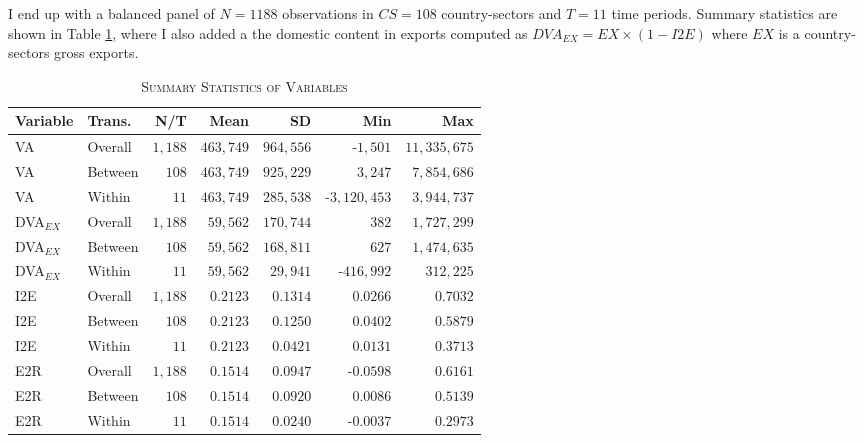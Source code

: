 \documentclass[a4paper]{article}
\begin{document}
I end up with a balanced panel of $N = 1188$ observations in $CS = 108$ country-sectors and $T = 11$ time periods. Summary statistics are shown in Table \ref{tab:SUMM_GROWTH}, where I also added a the domestic content in exports computed as $DVA_{EX} = EX \times (1 - I2E)$ where $EX$ is a country-sectors gross exports. 

\begin{table}[h!] \centering 
  \caption{\label{tab:SUMM_GROWTH}\textsc{Summary Statistics of Variables}}
  \vspace{2mm}
  \begin{center}
\begin{tabular}{ llrrrrr} \toprule
Variable & Trans. & N/T & Mean & SD & Min & Max \\ \midrule
VA & Overall & $1,188$ & $463,749$ & $964,556$ & -$1,501$ & $11,335,675$ \\ 
VA & Between & $108$ & $463,749$ & $925,229$ & $3,247$ & $7,854,686$ \\ 
VA & Within & $11$ & $463,749$ & $285,538$ & -$3,120,453$ & $3,944,737$ \\ 
DVA$_{EX}$ & Overall & $1,188$ & $59,562$ & $170,744$ & $382$ & $1,727,299$ \\ 
DVA$_{EX}$ & Between & $108$ & $59,562$ & $168,811$ & $627$ & $1,474,635$ \\ 
DVA$_{EX}$ & Within & $11$ & $59,562$ & $29,941$ & -$416,992$ & $312,225$ \\ 
I2E & Overall & $1,188$ & $0.2123$ & $0.1314$ & $0.0266$ & $0.7032$ \\ 
I2E & Between & $108$ & $0.2123$ & $0.1250$ & $0.0402$ & $0.5879$ \\ 
I2E & Within & $11$ & $0.2123$ & $0.0421$ & $0.0131$ & $0.3713$ \\ 
E2R & Overall & $1,188$ & $0.1514$ & $0.0947$ & -$0.0598$ & $0.6161$ \\ 
E2R & Between & $108$ & $0.1514$ & $0.0920$ & $0.0086$ & $0.5139$ \\ 
E2R & Within & $11$ & $0.1514$ & $0.0240$ & -$0.0037$ & $0.2973$ \\ 
\bottomrule
\end{tabular} 
 \end{center}
\end{table} 
\FloatBarrier 
\end{document}
